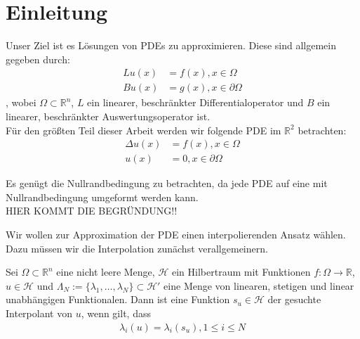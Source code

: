 \chapter{Einleitung}
\label{cha:Einleitung}


Unser Ziel ist es Lösungen von \acp{PDE} zu approximieren. Diese sind allgemein gegeben durch:
\begin{align*}
L u(x) &= f(x), x \in \Omega \\
B u(x) &= g(x), x \in \partial \Omega
\end{align*}
, wobei $\Omega \subset \mathbb{R}^n$, $L$ ein linearer, beschränkter Differentialoperator und $B$ ein linearer, beschränkter Auswertungsoperator ist.\\
Für den größten Teil dieser Arbeit werden wir folgende \ac{PDE} im $\mathbb{R}^2$ betrachten:
\begin{align*}
\Delta u(x) &= f(x), x \in \Omega \\
u(x) &= 0 , x \in \partial \Omega
\end{align*}

Es genügt die Nullrandbedingung zu betrachten, da jede \ac{PDE} auf eine mit Nullrandbedingung umgeformt werden kann.\\
HIER KOMMT DIE BEGRÜNDUNG!!

Wir wollen zur Approximation der \ac{PDE} einen interpolierenden Ansatz wählen. Dazu müssen wir die Interpolation zunächst verallgemeinern.

\begin{definition}
Sei $\Omega \subset \mathbb{R}^n$ eine nicht leere Menge, $\mathcal{H}$ ein Hilbertraum mit Funktionen $f:\Omega \rightarrow \mathbb{R}$, $u \in \mathcal{H}$  und $\Lambda_N := \{\lambda_1, \dots, \lambda_N\} \subset \mathcal{H}'$ eine Menge von linearen, stetigen und linear unabhängigen Funktionalen. Dann ist eine Funktion $s_u \in \mathcal{H}$ der gesuchte Interpolant von $u$, wenn gilt, dass
\begin{align*}
\lambda_i(u) = \lambda_i(s_u) , 1\le i \le N
\end{align*}
\end{definition}

